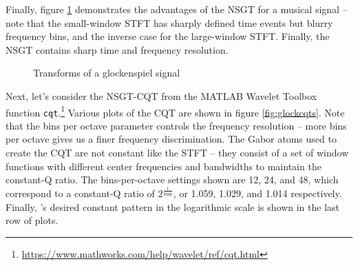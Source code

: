 \documentclass[letter,12pt,notitlepage]{article}
\begin{document}
Finally, figure \ref{fig:nsgtglock} demonstrates the advantages of the NSGT for a musical signal -- note that the small-window STFT has sharply defined time events but blurry frequency bins, and the inverse case for the large-window STFT. Finally, the NSGT contains sharp time and frequency resolution.

\begin{figure}[ht]
	\centering
	\hspace{0.35em}
	\hspace{0.35em}
	\caption{Transforms of a glockenspiel signal \cite{balazs}}
	\label{fig:nsgtglock}
\end{figure}

Next, let's consider the NSGT-CQT from the MATLAB Wavelet Toolbox function \Verb#cqt#.\footnote{\url{https://www.mathworks.com/help/wavelet/ref/cqt.html}} Various plots of the CQT are shown in figure \ref{fig:glockcqts}. Note that the bins per octave parameter controls the frequency resolution -- more bins per octave gives us a finer frequency discrimination. The Gabor atoms used to create the CQT are not constant like the STFT -- they consist of a set of window functions with different center frequencies and bandwidths to maintain the constant-Q ratio. The bins-per-octave settings shown are 12, 24, and 48, which correspond to a constant-Q ratio of $2^{\frac{1}{\text{bins}}}$, or 1.059, 1.029, and 1.014 respectively. Finally, \citet{jbrown}'s desired constant pattern in the logarithmic scale is shown in the last row of plots.
\end{document}
